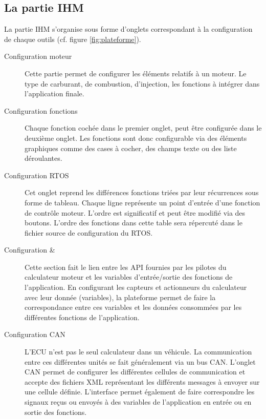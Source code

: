 \subsection{La partie IHM}
La partie IHM s'organise sous forme d'onglets correspondant à la configuration de chaque outils (cf. figure \ref{fig:plateforme}). 
\begin{description}
  \item[Configuration moteur] Cette partie permet de configurer les éléments relatifs à un moteur. Le type de carburant, de combustion, d'injection, les fonctions à intégrer dans l'application finale.
  \item[Configuration fonctions] Chaque fonction cochée dans le premier onglet, peut être configurée dans le deuxième onglet. Les fonctions sont donc configurable via des éléments graphiques comme des cases à cocher, des champs texte ou des liste déroulantes.
  \item[Configuration RTOS] Cet onglet reprend les différences fonctions triées par leur récurrences sous forme de tableau. Chaque ligne représente un point d'entrée d'une fonction de contrôle moteur. L'ordre est significatif et peut être modifié via des boutons. L'ordre des fonctions dans cette table sera répercuté dans le fichier source de configuration du RTOS.
  \item[Configuration  \& ] Cette section fait le lien entre les API fournies par les pilotes du calculateur moteur et les variables d'entrée/sortie des fonctions de l'application. En configurant les capteurs et actionneurs du calculateur avec leur donnée (variables), la plateforme permet de faire la correspondance entre ces variables et les données consommées par les différentes fonctions de l'application.
  \item[Configuration CAN] L'ECU n'est pas le seul calculateur dans un véhicule. La communication entre ces différentes unités se fait généralement via un bus CAN. L'onglet CAN permet de configurer les différentes cellules de communication et accepte des fichiers XML représentant les différents messages à envoyer sur une cellule définie. L'interface permet également de faire correspondre les signaux reçus ou envoyés à des variables de l'application en entrée ou en sortie des fonctions.
\end{description}

